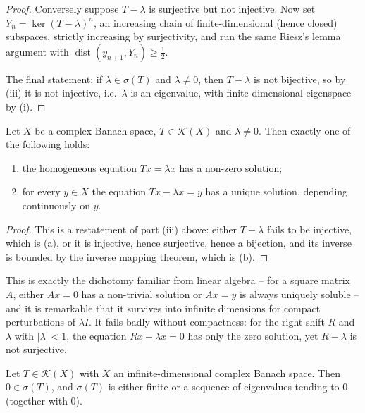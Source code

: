 \documentclass[a4paper]{scrartcl}
\newcommand{\Kop}{\mathcal{K}}
\DeclareMathOperator{\dist}{dist}
\begin{document}
\begin{proof}
	Conversely suppose $T - \lambda$ is surjective but not injective. Now set $Y_n = \ker(T-\lambda)^n$, an increasing chain of finite-dimensional (hence closed) subspaces, strictly increasing by surjectivity, and run the same Riesz's lemma argument with $\dist(y_{n+1}, Y_n)\geq\frac12$.

	The final statement: if $\lambda \in \sigma(T)$ and $\lambda \neq 0$, then $T-\lambda$ is not bijective, so by (iii) it is not injective, i.e.\ $\lambda$ is an eigenvalue, with finite-dimensional eigenspace by (i).
\end{proof}

\begin{theorem}
	Let $X$ be a complex Banach space, $T\in\Kop(X)$ and $\lambda\neq0$. Then exactly one of the following holds:
	\begin{enumerate}[label=(\alph*)]
		\item the homogeneous equation $Tx = \lambda x$ has a non-zero solution;
		\item for every $y \in X$ the equation $Tx - \lambda x = y$ has a unique solution, depending continuously on $y$.
	\end{enumerate}
\end{theorem}

\begin{proof}
	This is a restatement of part (iii) above: either $T-\lambda$ fails to be injective, which is (a), or it is injective, hence surjective, hence a bijection, and its inverse is bounded by the inverse mapping theorem, which is (b).
\end{proof}

This is exactly the dichotomy familiar from linear algebra -- for a square matrix $A$, either $Ax=0$ has a non-trivial solution or $Ax=y$ is always uniquely soluble -- and it is remarkable that it survives into infinite dimensions for compact perturbations of $\lambda I$. It fails badly without compactness: for the right shift $R$ and $\lambda$ with $|\lambda|<1$, the equation $Rx-\lambda x = 0$ has only the zero solution, yet $R-\lambda$ is not surjective.

\begin{theorem}
	Let $T \in\Kop(X)$ with $X$ an infinite-dimensional complex Banach space. Then $0 \in\sigma(T)$, and $\sigma(T)$ is either finite or a sequence of eigenvalues tending to $0$ (together with $0$).
\end{theorem}
\end{document}
